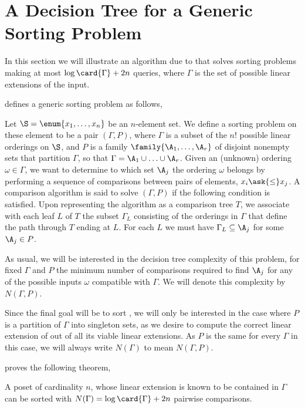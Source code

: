 \section{A Decision Tree for a Generic Sorting Problem}
\label{tree:xy:dt}

In this section we will illustrate an algorithm due to \citet*{fredman:1976}
that solves sorting problems making at most $\log\card{\Gamma} + 2n$ queries,
where $\Gamma$ is the set of possible linear extensions of the input.

\citet{fredman:1976} defines a generic sorting problem as follows,

\begin{problem}
Let $\S = \enum{x_1, \ldots, x_n}$ be an $n$-element set. We define a sorting
problem on these element to be a pair $(\Gamma, P)$, where $\Gamma$ is a
subset of the $n!$ possible linear orderings on $\S$, and
$P$ is a family $\family{\A_1, \ldots, \A_r}$ of disjoint nonempty sets that
partition $\Gamma$, so that $\Gamma = \A_1 \cup \ldots \cup \A_r$. Given an
(unknown) ordering $\omega \in \Gamma$, we want to determine to which set $\A_j$ the
ordering $\omega$ belongs by performing a sequence of comparisons between
pairs of elements, $x_i \ask{\le} x_j$. A comparison algorithm is said to
solve $(\Gamma, P)$ if the following condition is satisfied. Upon representing
the algorithm as a comparison tree $T$, we associate with each leaf $L$ of $T$
the subset $\Gamma_L$ consisting of the orderings in $\Gamma$ that define the
path through $T$ ending at $L$. For each $L$ we must have $\Gamma_L \subseteq
\A_j$ for some $\A_j \in P$.
\end{problem}

As usual, we will be interested in the decision tree complexity of this
problem, \ie for fixed \(\Gamma\) and \(P\) the minimum number of comparisons
required to find \(\A_j\) for any of the possible inputs \(\omega\) compatible
with \(\Gamma\). We will denote this complexity by $N(\Gamma, P)$.

Since the final goal will be to sort \XY, we will only be interested in the case
where $P$ is a partition of $\Gamma$ into singleton sets, as we desire to
compute the correct linear extension of \XY out of all its viable linear
extensions. As $P$ is the same for every $\Gamma$ in this case, we will
always write $N(\Gamma)$ to mean $N(\Gamma, P)$.

\citet{fredman:1976} proves the following theorem,

\begin{theorem}\label{theorem:fredman:1976}
A poset of cardinality $n$, whose linear extension is known to be contained in
$\Gamma$ can be sorted with $N(\Gamma) = \log \card{\Gamma} + 2n$ pairwise
comparisons.
\end{theorem}

